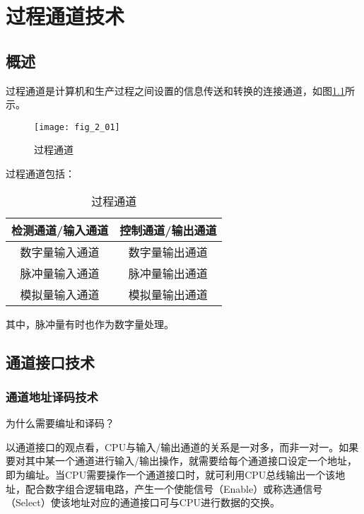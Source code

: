 \setcounter{chapter}{1}
\chapter[]{过程通道技术}


\section{概述}

过程通道是计算机和生产过程之间设置的信息传送和转换的连接通道，如图\ref{fig_2_01}所示。


\begin{figure}[h]
  \centering
  \texttt{[image: fig\_2\_01]}\\
  \caption{过程通道}\label{fig_2_01}
\end{figure}



过程通道包括：
\begin{table}[h]
  \centering
  \begin{tabular}{|c|c|}
  \hline
  检测通道/输入通道 & 控制通道/输出通道 \\  \hline

     数字量输入通道& 数字量输出通道\\

     脉冲量输入通道& 脉冲量输出通道\\

     模拟量输入通道& 模拟量输出通道\\  \hline
\end{tabular}

  \caption{过程通道}\label{tab:2.1}
\end{table}

其中，脉冲量有时也作为数字量处理。





\section{通道接口技术}




\subsection{通道地址译码技术}

\begin{remark}
  为什么需要编址和译码？

  以通道接口的观点看，CPU与输入/输出通道的关系是一对多，而非一对一。如果要对其中某一个通道进行输入/输出操作，就需要给每个通道接口设定一个地址，即为编址。当CPU需要操作一个通道接口时，就可利用CPU总线输出一个该地址，配合数字组合逻辑电路，产生一个使能信号（Enable）或称选通信号（Select）使该地址对应的通道接口可与CPU进行数据的交换。
\end{remark}

